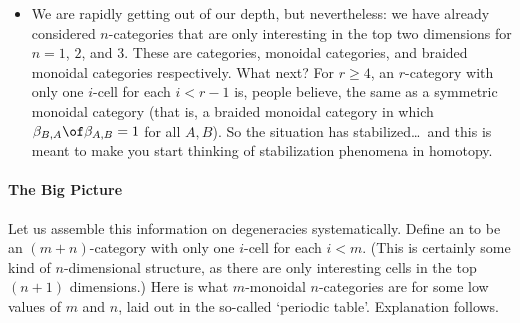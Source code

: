 \begin{itemize}
\item We are rapidly getting out of our depth, but nevertheless: we have
already considered $n$-categories that are only interesting in the top two
dimensions for $n= 1$, $2$, and $3$.  These are categories, monoidal
categories, and braided monoidal categories respectively.  What next?  For
$r\geq 4$, an $r$-category with only one $i$-cell for each $i<r-1$ is,
people believe, the same as a symmetric%
%
%
monoidal category (that is, a
braided monoidal category in which $\beta_{B,A} \of \beta_{A,B} = 1$ for
all $A,B$).  So the situation has stabilized\ldots\ and this is meant to
make you start thinking of stabilization phenomena in homotopy.
\end{itemize}

\paragraph*{The Big Picture}  Let us assemble this information on
degeneracies systematically.  Define an %
%
%
%
to be an $(m+n)$-category with only one $i$-cell for each $i<m$.  (This is
certainly some kind of $n$-dimensional structure, as there are only
interesting cells in the top $(n+1)$ dimensions.)  Here is what $m$-monoidal
$n$-categories are for some low values of $m$ and $n$, laid out in the
so-called `periodic%
%
%
table'.  Explanation follows.

